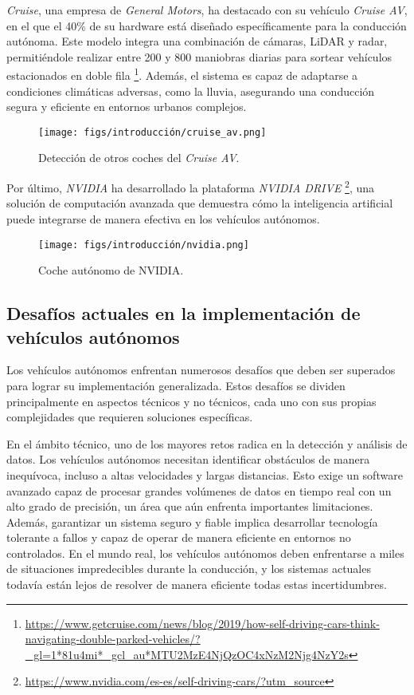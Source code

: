 \textit{Cruise}, una empresa de \textit{General Motors}, ha destacado con su vehículo \textit{Cruise AV}, en el que el 40\% de su hardware está diseñado específicamente para la conducción autónoma. Este modelo integra una combinación de cámaras, \ac{LiDAR} y radar, permitiéndole realizar entre 200 y 800 maniobras diarias para sortear vehículos estacionados en doble fila \footnote{\url{https://www.getcruise.com/news/blog/2019/how-self-driving-cars-think-navigating-double-parked-vehicles/?_gl=1*81u4mi*_gcl_au*MTU2MzE4NjQzOC4xNzM2Njg4NzY2s}}. Además, el sistema es capaz de adaptarse a condiciones climáticas adversas, como la lluvia, asegurando una conducción segura y eficiente en entornos urbanos complejos.

\clearpage

\begin{figure}[ht]
  \begin{center}
    \texttt{[image: figs/introducción/cruise\_av.png]}
  \end{center}
  \caption{Detección de otros coches del \textit{Cruise AV}.}
  \label{cruise}
\end{figure}

Por último, \textit{NVIDIA} ha desarrollado la plataforma \textit{NVIDIA DRIVE} \footnote{\url{https://www.nvidia.com/es-es/self-driving-cars/?utm_source}}, una solución de computación avanzada que demuestra cómo la inteligencia artificial puede integrarse de manera efectiva en los vehículos autónomos.

\begin{figure}[ht]
  \begin{center}
    \texttt{[image: figs/introducción/nvidia.png]}
  \end{center}
  \caption{Coche autónomo de NVIDIA.}
  \label{nvidia}
\end{figure}

\subsection{Desafíos actuales en la implementación de vehículos autónomos}
\label{sec:desafíos}

Los vehículos autónomos enfrentan numerosos desafíos que deben ser superados para lograr su implementación generalizada. Estos desafíos se dividen principalmente en aspectos técnicos y no técnicos, cada uno con sus propias complejidades que requieren soluciones específicas.

En el ámbito técnico, uno de los mayores retos radica en la detección y análisis de datos. Los vehículos autónomos necesitan identificar obstáculos de manera inequívoca, incluso a altas velocidades y largas distancias. Esto exige un software avanzado capaz de procesar grandes volúmenes de datos en tiempo real con un alto grado de precisión, un área que aún enfrenta importantes limitaciones. Además, garantizar un sistema seguro y fiable implica desarrollar tecnología tolerante a fallos y capaz de operar de manera eficiente en entornos no controlados. En el mundo real, los vehículos autónomos deben enfrentarse a miles de situaciones impredecibles durante la conducción, y los sistemas actuales todavía están lejos de resolver de manera eficiente todas estas incertidumbres.


